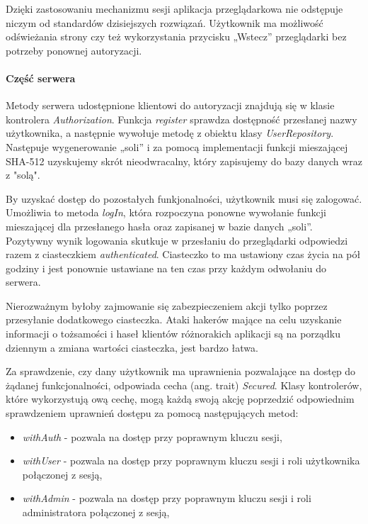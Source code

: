 \documentclass[a4paper,12pt,twoside]{article}
\begin{document}
Dzięki zastosowaniu mechanizmu sesji aplikacja przeglądarkowa nie odstępuje niczym
od standardów dzisiejszych rozwiązań.
Użytkownik ma możliwość odświeżania strony czy też wykorzystania przycisku „Wstecz” przeglądarki bez potrzeby ponownej autoryzacji.

\paragraph{Część serwera}
Metody serwera udostępnione klientowi do autoryzacji
znajdują się w klasie kontrolera \textit{Authorization}.
Funkcja \textit{register}
sprawdza dostępność przesłanej nazwy użytkownika, a następnie wywołuje
metodę z obiektu klasy \textit{UserRepository}.
Następuje wygenerowanie „soli” i za pomocą implementacji funkcji mieszającej
SHA-512 uzyskujemy skrót nieodwracalny, który zapisujemy do bazy danych wraz z "solą".

By uzyskać dostęp do pozostałych funkjonalności, użytkownik musi się zalogować.
Umożliwia to metoda \textit{logIn}, która rozpoczyna ponowne wywołanie
funkcji mieszającej dla przesłanego hasła oraz zapisanej w bazie danych „soli”. Pozytywny wynik logowania skutkuje w przesłaniu do przeglądarki
odpowiedzi razem z ciasteczkiem \textit{authenticated}.
Ciasteczko to ma ustawiony czas życia na pół godziny i jest ponownie
ustawiane na ten czas przy każdym odwołaniu do serwera.

Nierozważnym byłoby zajmowanie się zabezpieczeniem akcji
tylko poprzez przesyłanie dodatkowego ciasteczka.
Ataki hakerów mające na celu uzyskanie informacji o tożsamości i haseł
klientów różnorakich aplikacji są na porządku dziennym a zmiana
wartości ciasteczka, jest bardzo łatwa.

\newpage
Za sprawdzenie, czy dany użytkownik ma uprawnienia pozwalające
na dostęp do żądanej funkcjonalności, odpowiada
cecha (ang. trait) \textit{Secured}.
Klasy kontrolerów, które wykorzystują ową cechę, mogą każdą
swoją akcję poprzedzić odpowiednim sprawdzeniem uprawnień dostępu
za pomocą następujących metod:
\begin{itemize}
\item \textit{withAuth} - pozwala na dostęp przy poprawnym kluczu sesji,
\item \textit{withUser} - pozwala na dostęp przy poprawnym kluczu sesji i roli użytkownika połączonej z sesją,
\item \textit{withAdmin} - pozwala na dostęp przy poprawnym kluczu sesji i roli administratora połączonej z sesją,
\end{itemize}
\end{document}
